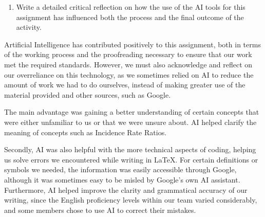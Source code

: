 \documentclass[10pt,a4paper,twoside]{article}\usepackage[]{graphicx}\usepackage[]{xcolor}
\begin{document}
\begin{enumerate}
\textbf{3. LaTeX coding}

Prompts:
\begin{itemize}
    \item "How to write Ir = I/$\Delta$t in LaTeX to look like a formula/equation?"
    \item "Running pdflatex.exe on SHSA2G07.tex...failed. What is the error?"
    \item "Where to find figure1-1 if it doesn't compile correctly?"
    \item "How do I fix a unicode character error?"
\end{itemize}

\textbf{4. Language barrier difficulties and summarizations}

Prompts:
\begin{itemize}
    \item "Can you translate and summarize the assignment to catalan?"
    \item "Correct any incorrect grammatical mistakes."
\end{itemize}
\[
\]
    \item Write a detailed critical reflection on how the use of the AI tools for this assignment has influenced both the process and the final outcome of the activity.
\end{enumerate}

Artificial Intelligence has contributed positively to this assignment, both in terms of the working process and the proofreading necessary to ensure that our work met the required standards. However, we must also acknowledge and reflect on our overreliance on this technology, as we sometimes relied on AI to reduce the amount of work we had to do ourselves, instead of making greater use of the material provided and other sources, such as Google.

The main advantage was gaining a better understanding of certain concepts that were either unfamiliar to us or that we were unsure about. AI helped clarify the meaning of concepts such as Incidence Rate Ratios.

Secondly, AI was also helpful with the more technical aspects of coding, helping us solve errors we encountered while writing in \LaTeX. For certain definitions or symbols we needed, the information was easily accessible through Google, although it was sometimes easy to be misled by Google's own AI assistant. Furthermore, AI helped improve the clarity and grammatical accuracy of our writing, since the English proficiency levels within our team varied considerably, and some members chose to use AI to correct their mistakes.
\end{document}

